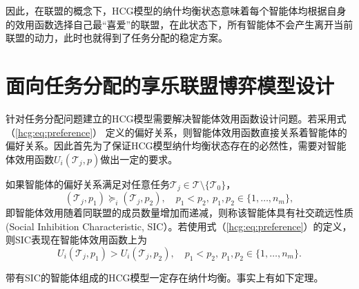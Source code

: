因此，在联盟的概念下，HCG模型的纳什均衡状态意味着每个智能体均根据自身的效用函数选择自己最“喜爱”的联盟，在此状态下，所有智能体不会产生离开当前联盟的动力，此时也就得到了任务分配的稳定方案。



\section{面向任务分配的享乐联盟博弈模型设计}
\label{hcg:HGTA}


针对任务分配问题建立的HCG模型需要解决智能体效用函数设计问题。若采用式（\ref{hcg:eq:preference}） 定义的偏好关系，则智能体效用函数直接关系着智能体的偏好关系。因此首先为了保证HCG模型纳什均衡状态存在的必然性，需要对智能体效用函数$U_i(\mathcal{T}_j,p)$做出一定的要求。

\begin{definition}[社交疏远性质]
\label{hcg:eq:spao}
	如果智能体的偏好关系满足对任意任务$\mathcal{T}_j \in \mathcal{T} \setminus \{\mathcal{T}_0\}$，
	\begin{equation}
	\label{hcg:eq:spaoPrefer}
		(\mathcal{T}_j,p_1) \succeq_i (\mathcal{T}_j,p_2),\quad p_1 < p_2,\ p_1,p_2 \in \{1,\dots,n_m\},
	\end{equation}
	即智能体效用随着同联盟的成员数量增加而递减，则称该智能体具有社交疏远性质(Social Inhibition Characteristic, SIC）。若使用式（\ref{hcg:eq:preference}）的定义，则SIC表现在智能体效用函数上为
	\begin{equation}
	\label{hcg:eq:spaoU}
		U_i(\mathcal{T}_j,p_1) > U_i(\mathcal{T}_j,p_2),\quad p_1<p_2,\ p_1,p_2 \in \{1,\dots,n_m\}.
	\end{equation}
\end{definition}

带有SIC的智能体组成的HCG模型一定存在纳什均衡。事实上有如下定理。

